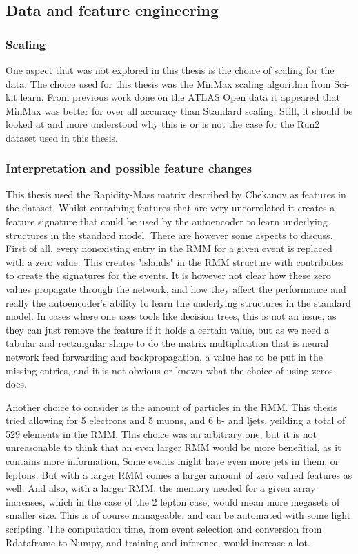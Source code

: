 \subsection*{Data and feature engineering}
\subsubsection*{Scaling}
One aspect that was not explored in this thesis is the choice of scaling for the data. The choice used for this 
thesis was the MinMax scaling algorithm from Sci-kit learn. From previous work done on the ATLAS Open data 
\cite{ATL-OREACH-PUB-2020-001} it appeared that MinMax was better for over all accuracy than Standard scaling.
Still, it should be looked at and more understood why this is or is not the case for the Run2 dataset used in this 
thesis. 

\subsubsection*{Interpretation and possible feature changes}
This thesis used the Rapidity-Mass matrix described by Chekanov\cite{Chekanov_2019} as features in the dataset. 
Whilst containing features that are very uncorrolated it creates a feature signature that could be used by 
the autoencoder to learn underlying structures in the standard model. There are however some aspects to discuss. 
First of all, every nonexisting entry in the RMM for a given event is replaced with a zero value. This creates 
"islands" in the RMM structure with contributes to create the signatures for the events. It is however not clear 
how these zero values propagate through the network, and how they affect the performance and really the autoencoder's 
ability to learn the underlying structures in the standard model. In cases where one uses tools like decision trees, 
this is not an issue, as they can just remove the feature if it holds a certain value, but as we need a tabular and 
rectangular shape to do the matrix multiplication that is neural network feed forwarding and backpropagation, a value
has to be put in the missing entries, and it is not obvious or known what the choice of using zeros does. \par 
Another choice to consider is the amount of particles in the RMM. This thesis tried allowing for 5 electrons and 5 muons, 
and 6 b- and ljets, yeilding a total of 529 elements in the RMM. This choice was an arbitrary one, but it is not 
unreasonable to think that an even larger RMM would be more benefitial, as it contains more information. Some 
events might have even more jets in them, or leptons. But with a larger RMM comes a larger amount of zero valued 
features as well. And also, with a larger RMM, the memory needed for a given array increases, which in the case of
the 2 lepton case, would mean more megasets of smaller size. This is of course manageable, and can be automated with 
some light scripting. The computation time, from event selection and conversion from Rdataframe to Numpy, and training 
and inference, would increase a lot. \par 





